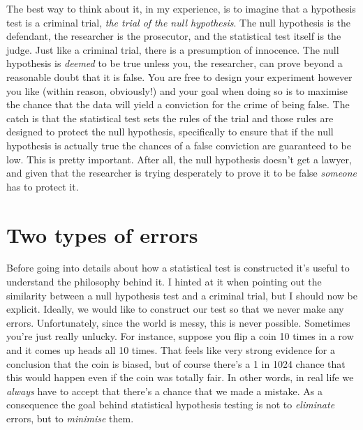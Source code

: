 The best way to think about it, in my experience, is to imagine that a hypothesis test is a criminal trial, {\it the trial of the null hypothesis}. The null hypothesis is the defendant, the researcher is the prosecutor, and the statistical test itself is the judge. Just like a criminal trial, there is a presumption of innocence. The null hypothesis is {\it deemed} to be true unless you, the researcher, can prove beyond a reasonable doubt that it is false. You are free to design your experiment however you like (within reason, obviously!) and your goal when doing so is to maximise the chance that the data will yield a conviction for the crime of being false. The catch is that the statistical test sets the rules of the trial and those rules are designed to protect the null hypothesis, specifically to ensure that if the null hypothesis is actually true the chances of a false conviction are guaranteed to be low. This is pretty important. After all, the null hypothesis doesn't get a lawyer, and given that the researcher is trying desperately to prove it to be false {\it someone} has to protect it.  


\section{Two types of errors~\label{sec:errortypes}}

Before going into details about how a statistical test is constructed it's useful to understand the philosophy behind it. I hinted at it when pointing out the similarity between a null hypothesis test and a criminal trial, but I should now be explicit. Ideally, we would like to construct our test so that we never make any errors. Unfortunately, since the world is messy, this is never possible. Sometimes you're just really unlucky. For instance, suppose you flip a coin 10 times in a row and it comes up heads all 10 times. That feels like very strong evidence for a conclusion that the coin is biased, but of course there's a 1 in 1024 chance that this would happen even if the coin was totally fair. In other words, in real life we {\it always} have to accept that there's a chance that we made a mistake. As a consequence the goal behind statistical hypothesis testing is not to {\it eliminate} errors, but to {\it minimise} them.

